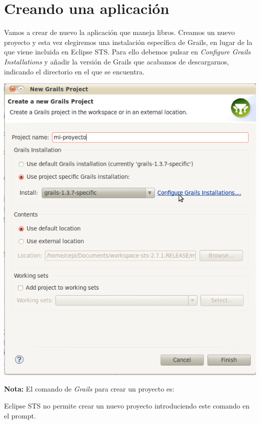 \documentclass[a4paper,12pt,spanish]{article}
\begin{document}
\section{Creando una aplicación}

Vamos a crear de nuevo la aplicación que maneja libros. Creamos un nuevo proyecto y esta vez elegiremos una instalación específica de Grails, en lugar de la que viene incluida en Eclipse STS. Para ello debemos pulsar en {\it Configure Grails Installations} y añadir la versión de Grails que acabamos de descargarnos, indicando el directorio en el que se encuentra.\\

\begin{centering}
\includegraphics[scale=0.35]{new-project}\\
\end{centering}

{\bf Nota:} El comando de {\it Grails} para crear un proyecto es:

Eclipse STS no permite crear un nuevo proyecto introduciendo este comando en el prompt.\\
\end{document}
